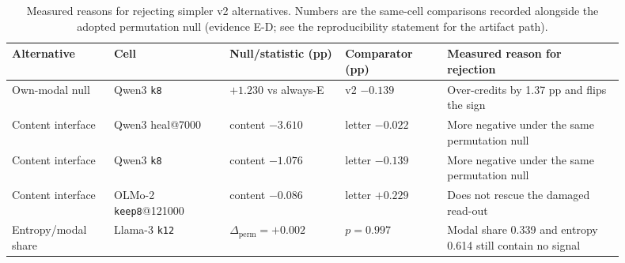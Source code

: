 \begin{table}[!htbp]
\centering
\scriptsize
\setlength{\tabcolsep}{3.0pt}
\begin{tabular}{p{0.15\linewidth}p{0.17\linewidth}p{0.17\linewidth}p{0.15\linewidth}p{0.26\linewidth}}
\toprule
Alternative & Cell & Null/statistic (pp) & Comparator (pp) & Measured reason for rejection \\
\midrule
Own-modal null & Qwen3 \texttt{k8} & $+1.230$ vs always-E & v2 $-0.139$ & Over-credits by 1.37 pp and flips the sign \\
Content interface & Qwen3 heal@7000 & content $-3.610$ & letter $-0.022$ & More negative under the same permutation null \\
Content interface & Qwen3 \texttt{k8} & content $-1.076$ & letter $-0.139$ & More negative under the same permutation null \\
Content interface & OLMo-2 \texttt{keep8}@121000 & content $-0.086$ & letter $+0.229$ & Does not rescue the damaged read-out \\
Entropy/modal share & Llama-3 \texttt{k12} & $\Delta_{\mathrm{perm}}=+0.002$ & $p=0.997$ & Modal share 0.339 and entropy 0.614 still contain no signal \\
\bottomrule
\end{tabular}
\caption{Measured reasons for rejecting simpler v2 alternatives. Numbers are the same-cell comparisons recorded alongside the adopted permutation null (evidence \textsf{E-D}; see the reproducibility statement for the artifact path).}
\label{tab:v2-alternatives}
\end{table}
